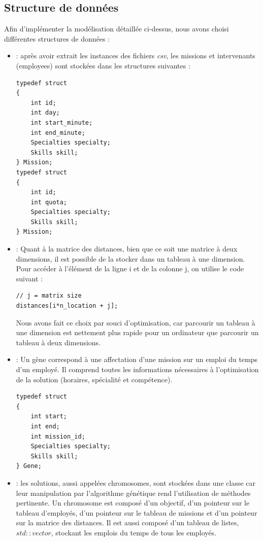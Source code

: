 \documentclass{article}
\begin{document}
    \subsection{Structure de données}
    Afin d'implémenter la modélisation détaillée ci-dessus, nous avons choisi différentes structures de données :
    \begin{itemize}
    \item {} : après avoir extrait les instances des fichiers \emph{csv}, les missions et intervenants (employees) sont stockées dans les structures suivantes : 
    \begin{lstlisting}
typedef struct
{
    int id;
    int day;
    int start_minute;
    int end_minute;
    Specialties specialty;
    Skills skill;
} Mission;
typedef struct
{
    int id;
    int quota;
    Specialties specialty;
    Skills skill;
} Mission;
    \end{lstlisting}
    \item {}: 
    Quant à la matrice des distances, bien que ce soit une matrice à deux dimensions, il est possible de la stocker dans un tableau à une dimension. Pour accéder à l'élément de la ligne i et de la colonne j, on utilise le code suivant :
    \begin{lstlisting}
// j = matrix size
distances[i*n_location + j];
    \end{lstlisting}
    Nous avons fait ce choix par souci d'optimisation, car parcourir un tableau à une dimension est nettement plus rapide pour un ordinateur que parcourir un tableau à deux dimensions.
    \item {}: 
    Un gène correspond à une affectation d'une mission sur un emploi du temps d'un employé. Il comprend toutes les informations nécessaires à l'optimisation de la solution (horaires, spécialité et compétence).
    \begin{lstlisting}
typedef struct
{
    int start;
    int end;
    int mission_id;
    Specialties specialty;
    Skills skill;
} Gene;
    \end{lstlisting}
    \item {} : les solutions, aussi appelées chromosomes, sont stockées dans une classe car leur manipulation par l'algorithme génétique rend l'utilisation de méthodes pertinente. Un chromosome est composé d'un objectif, d'un pointeur sur le tableau d'employés, d'un pointeur sur le tableau de missions et d'un pointeur sur la matrice des distances. Il est aussi composé d'un tableau de listes, $std::vector$, stockant les emplois du temps de tous les employés.

\end{itemize}
\end{document}
